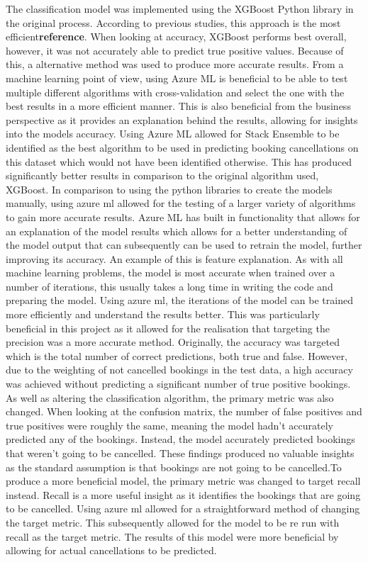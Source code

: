The classification model was implemented using the XGBoost Python library in the original process. According to previous studies, this approach is the most efficient\textbf{reference}. When looking at accuracy, XGBoost performs best overall, however, it was not accurately able to predict true positive values. Because of this, a alternative method was used to produce more accurate results. 
\vspace{5mm}
From a machine learning point of view, using Azure ML is beneficial to be able to test multiple different algorithms with cross-validation and select the one with the best results in a more efficient manner. This is also beneficial from the business perspective as it provides an explanation behind the results, allowing for insights into the models accuracy. Using Azure ML allowed for Stack Ensemble to be identified as the best algorithm to be used in predicting booking cancellations on this dataset which would not have been identified otherwise. This has produced significantly better results in comparison to the original algorithm used, XGBoost. In comparison to using the python libraries to create the models manually, using azure ml allowed for the testing of a larger variety of algorithms to gain more accurate results. Azure ML has built in functionality that allows for an explanation of the model results which allows for a better understanding of the model output that can subsequently can be used to retrain the model, further improving its accuracy. An example of this is feature explanation.
\vspace{5mm}
As with all machine learning problems, the model is most accurate when trained over a number of iterations, this usually takes a long time in writing the code and preparing the model. Using azure ml, the iterations of the model can be trained more efficiently and understand the results better. This was particularly beneficial in this project as it allowed for the realisation that targeting the precision was a more accurate method. Originally, the accuracy was targeted which is the total number of correct predictions, both true and false. However, due to the weighting of not cancelled bookings in the test data, a high accuracy was achieved without predicting a significant number of true positive bookings. 
\vspace{5mm}
As well as altering the classification algorithm, the primary metric was also changed. When looking at the confusion matrix, the number of false positives and true positives were roughly the same, meaning the model hadn't accurately predicted any of the bookings. Instead, the model accurately predicted bookings that weren't going to be cancelled. These findings produced no valuable insights as the standard assumption is that bookings are not going to be cancelled.To produce a more beneficial model, the primary metric was changed to target recall instead. Recall is a more useful insight as it identifies the bookings that are going to be cancelled. Using azure ml allowed for a straightforward method of changing the target metric. This subsequently allowed for the model to be re run with recall as the target metric. The results of this model were more beneficial by allowing for actual cancellations to be predicted. 

